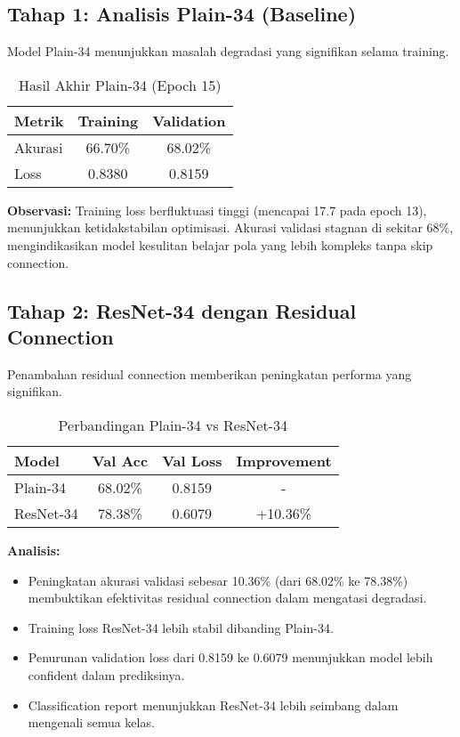 \documentclass[11pt,a4paper]{article}
\begin{document}
\subsection{Tahap 1: Analisis Plain-34 (Baseline)}
Model Plain-34 menunjukkan masalah degradasi yang signifikan selama training.

\begin{table}[h]
\centering
\caption{Hasil Akhir Plain-34 (Epoch 15)}
\begin{tabular}{lcc}
\toprule
\textbf{Metrik} & \textbf{Training} & \textbf{Validation} \\ 
\midrule
Akurasi & 66.70\% & 68.02\% \\ 
Loss    & 0.8380 & 0.8159 \\ 
\bottomrule
\end{tabular}
\end{table}

\textbf{Observasi:} Training loss berfluktuasi tinggi (mencapai 17.7 pada epoch 13), menunjukkan ketidakstabilan optimisasi. Akurasi validasi stagnan di sekitar 68\%, mengindikasikan model kesulitan belajar pola yang lebih kompleks tanpa skip connection.

\subsection{Tahap 2: ResNet-34 dengan Residual Connection}
Penambahan residual connection memberikan peningkatan performa yang signifikan.

\begin{table}[h]
\centering
\caption{Perbandingan Plain-34 vs ResNet-34}
\begin{tabular}{lccc}
\toprule
\textbf{Model} & \textbf{Val Acc} & \textbf{Val Loss} & \textbf{Improvement} \\ 
\midrule
Plain-34 & 68.02\% & 0.8159 & - \\
ResNet-34 & 78.38\% & 0.6079 & +10.36\% \\ 
\bottomrule
\end{tabular}
\end{table}

\textbf{Analisis:}
\begin{itemize}
    \item Peningkatan akurasi validasi sebesar 10.36\% (dari 68.02\% ke 78.38\%) membuktikan efektivitas residual connection dalam mengatasi degradasi.
    \item Training loss ResNet-34 lebih stabil dibanding Plain-34.
    \item Penurunan validation loss dari 0.8159 ke 0.6079 menunjukkan model lebih confident dalam prediksinya.
    \item Classification report menunjukkan ResNet-34 lebih seimbang dalam mengenali semua kelas.
\end{itemize}
\end{document}
